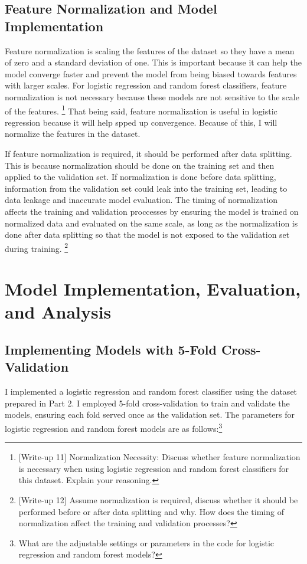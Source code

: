 \documentclass{labReport}
\begin{document}
\begin{multicols*}{2}
    \subsection{Feature Normalization and Model Implementation}

    Feature normalization is scaling the features of the dataset so they have a mean of zero and a standard deviation of one. This is important because it can help the model converge faster and prevent the model from being biased towards features with larger scales. For logistic regression and random forest classifiers, feature normalization is not necessary because these models are not sensitive to the scale of the features. \footnote{[Write-up 11] Normalization Necessity: Discuss whether feature normalization is necessary when using logistic regression and random forest classifiers for this dataset. Explain your reasoning.} That being said, feature normalization is useful in logistic regression because it will help spped up convergence. Because of this, I will normalize the features in the dataset.

    If feature normalization is required, it should be performed after data splitting. This is because normalization should be done on the training set and then applied to the validation set. If normalization is done before data splitting, information from the validation set could leak into the training set, leading to data leakage and inaccurate model evaluation. The timing of normalization affects the training and validation proccesses by ensuring the model is trained on normalized data and evaluated on the same scale, as long as the normalization is done after data splitting so that the model is not exposed to the validation set during training. \footnote{[Write-up 12] Assume normalization is required, discuss whether it should be performed before or after data splitting and why. How does the timing of normalization affect the training and validation processes?}


    \section{Model Implementation, Evaluation, and Analysis}
    \subsection{Implementing Models with 5-Fold Cross-Validation}
    I implemented a logistic regression and random forest classifier using the dataset prepared in Part 2. I employed 5-fold cross-validation to train and validate the models, ensuring each fold served once as the validation set. The parameters for logistic regression and random forest models are as follows:\footnote{What are the adjustable settings or parameters in the code for logistic regression and random forest models?}



\end{multicols*}
\end{document}
